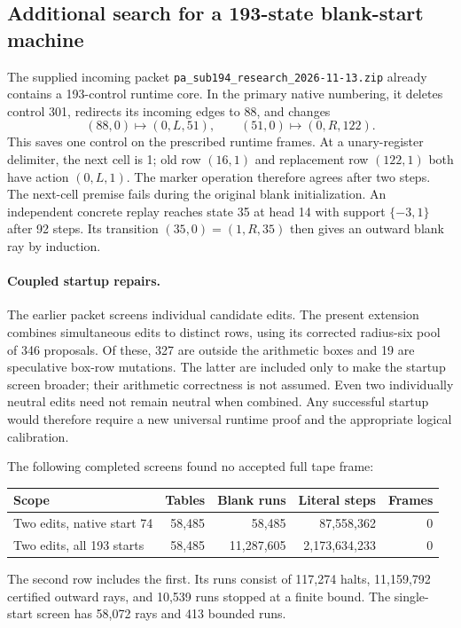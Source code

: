 \subsection{Additional search for a 193-state blank-start machine}

The supplied incoming packet \texttt{pa\_sub194\_research\_2026-11-13.zip}
already contains a 193-control runtime core. In the primary native numbering,
it deletes control 301, redirects its incoming edges to 88, and changes
\[
 (88,0)\longmapsto(0,L,51),\qquad
 (51,0)\longmapsto(0,R,122).
\]
This saves one control on the prescribed runtime frames. At a unary-register
delimiter, the next cell is 1; old row $(16,1)$ and replacement row
$(122,1)$ both have action $(0,L,1)$. The marker operation therefore agrees
after two steps. The next-cell premise fails during the original blank
initialization. An independent concrete replay reaches state 35 at head
14 with support $\{-3,1\}$ after 92 steps. Its transition $(35,0)=(1,R,35)$
then gives an outward blank ray by induction.

\paragraph{Coupled startup repairs.}
The earlier packet screens individual candidate edits. The present extension
combines simultaneous edits to distinct rows, using its corrected radius-six
pool of 346 proposals. Of these, 327 are outside the arithmetic boxes and
19 are speculative box-row mutations. The latter are included only to make
the startup screen broader; their arithmetic correctness is not assumed.
Even two individually neutral edits need not remain neutral when combined.
Any successful startup would therefore require a new universal runtime
proof and the appropriate logical calibration.

The following completed screens found no accepted full tape frame:
\begin{center}\small
\begin{tabular}{lrrrr}
\hline
Scope & Tables & Blank runs & Literal steps & Frames\\
\hline
Two edits, native start 74 & 58,485 & 58,485 & 87,558,362 & 0\\
Two edits, all 193 starts & 58,485 & 11,287,605 & 2,173,634,233 & 0\\
\hline
\end{tabular}
\end{center}
The second row includes the first. Its runs consist of 117,274 halts,
11,159,792 certified outward rays, and 10,539 runs stopped at a finite
bound. The single-start screen has 58,072 rays and 413 bounded runs.


